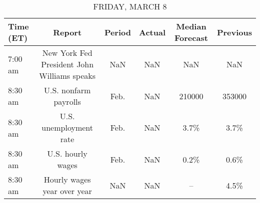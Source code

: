 \documentclass{article}%
\begin{document}
%


\begin{table}[htbp]%
\caption{FRIDAY, MARCH 8}%
\centering%
\begin{adjustbox}{width=1\textwidth}%
\begin{tabular}{lccccc}
\toprule
Time (ET) &                                      Report & Period & Actual & Median Forecast & Previous \\
\midrule
  7:00 am & New York Fed President John Williams speaks &    NaN &    NaN &             NaN &      NaN \\
  8:30 am &                       U.S. nonfarm payrolls &   Feb. &    NaN &          210000 &   353000 \\
  8:30 am &                      U.S. unemployment rate &   Feb. &    NaN &            3.7\% &     3.7\% \\
  8:30 am &                           U.S. hourly wages &   Feb. &    NaN &            0.2\% &     0.6\% \\
  8:30 am &                 Hourly wages year over year &    NaN &    NaN &              -- &     4.5\% \\
\bottomrule
\end{tabular}
%
\end{adjustbox}%
\end{table}
\end{document}
